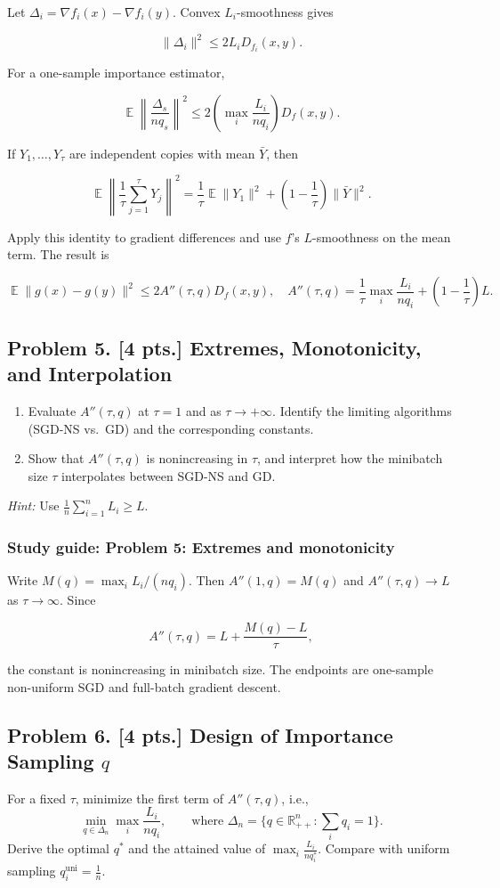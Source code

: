 \documentclass[11pt,a4paper]{article}
\DeclareMathOperator{\E}{\mathbb{E}}
\begin{document}
Let $\Delta_i=\nabla f_i(x)-\nabla f_i(y)$. Convex $L_i$-smoothness gives

\[
\|\Delta_i\|^2\leq 2L_iD_{f_i}(x,y).
\]

For a one-sample importance estimator,

\[
\E\left\|\frac{\Delta_s}{nq_s}\right\|^2
\leq 2\left(\max_i\frac{L_i}{nq_i}\right)D_f(x,y).
\]

If $Y_1,\ldots,Y_\tau$ are independent copies with mean $\bar Y$, then

\[
\E\left\|\frac1\tau\sum_{j=1}^{\tau}Y_j\right\|^2
=\frac1\tau\E\|Y_1\|^2+\left(1-\frac1\tau\right)\|\bar Y\|^2.
\]

Apply this identity to gradient differences and use $f$'s $L$-smoothness on the mean term. The result is

\[
\E\|g(x)-g(y)\|^2
\leq 2A''(\tau,q)D_f(x,y),
\quad
A''(\tau,q)=\frac1\tau\max_i\frac{L_i}{nq_i}+\left(1-\frac1\tau\right)L.
\]



\subsection{Problem 5. [4 pts.] Extremes, Monotonicity, and Interpolation}
\begin{enumerate}[label=(\alph*)]
    \item Evaluate $A''(\tau, q)$ at $\tau = 1$ and as $\tau \to +\infty$. Identify the limiting algorithms (SGD-NS vs.\ GD) and the corresponding constants.
    \item Show that $A''(\tau, q)$ is nonincreasing in $\tau$, and interpret how the minibatch size $\tau$ interpolates between SGD-NS and GD.
\end{enumerate}
\textit{Hint:} Use $\frac{1}{n} \sum_{i=1}^{n} L_i \ge L$.


\subsubsection{Study guide: Problem 5: Extremes and monotonicity}

Write $M(q)=\max_iL_i/(nq_i)$. Then $A''(1,q)=M(q)$ and $A''(\tau,q)\to L$ as $\tau\to\infty$. Since

\[
A''(\tau,q)=L+\frac{M(q)-L}{\tau},
\]

the constant is nonincreasing in minibatch size. The endpoints are one-sample non-uniform SGD and full-batch gradient descent.



\subsection{Problem 6. [4 pts.] Design of Importance Sampling $q$}
For a fixed $\tau$, minimize the first term of $A''(\tau, q)$, i.e.,
\[
\min_{q \in \Delta_n} \max_i \frac{L_i}{n q_i}, \qquad \text{where } \Delta_n = \bigl\{ q \in \mathbb{R}_{++}^{n} : \sum_i q_i = 1 \bigr\}.
\]
Derive the optimal $q^{*}$ and the attained value of $\max_i \frac{L_i}{n q_i^{*}}$. Compare with uniform sampling $q_i^{\mathrm{uni}} = \frac{1}{n}$.
\end{document}
